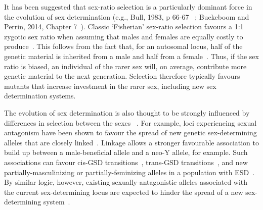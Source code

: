 \documentclass[10pt,letterpaper]{article}
\begin{document}
It has been suggested that sex-ratio selection is a particularly dominant force in the evolution of sex determination (e.g., Bull, 1983, p 66-67 ~\cite{Bull:1983vi}; Buekeboom and Perrin, 2014, Chapter 7~\cite{Beukeboom:2014vb}). 
Classic `Fisherian' sex-ratio selection favours a 1:1 zygotic sex ratio when assuming that males and females are equally costly to produce~\cite{Fisher:1930wy,Charnov:1982wg}. 
This follows from the fact that, for an autosomal locus, half of the genetic material is inherited from a male and half from a female~\cite{West:2009we}. 
Thus, if the sex ratio is biased, an individual of the rarer sex will, on average, contribute more genetic material to the next generation. 
Selection therefore typically favours mutants that increase investment in the rarer sex, including new sex determination systems.

The evolution of sex determination is also thought to be strongly influenced by differences in selection between the sexes ~\cite{Blaser2012, Beukeboom:2014vb,vanDoorn2014re}.
For example, loci experiencing sexual antagonism have been shown to favour the spread of new genetic sex-determining alleles that are closely linked~\cite{vanDoorn:2007eu,vanDoorn:2010hu,Muralidhar2018}. 
Linkage allows a stronger favourable association to build up between a male-beneficial allele and a neo-Y allele, for example. 
Such associations can favour cis-GSD transitions~\cite{vanDoorn:2007eu}, trans-GSD transitions~\cite{vanDoorn:2010hu}, and new partially-masculinizing or partially-feminizing alleles in a population with ESD~\cite{Muralidhar2018}.
By similar logic, however, existing sexually-antagonistic alleles associated with the current sex-determining locus are expected to hinder the spread of a new sex-determining system~\cite{vanDoorn:2007eu,vanDoorn:2010hu}.
\end{document}
